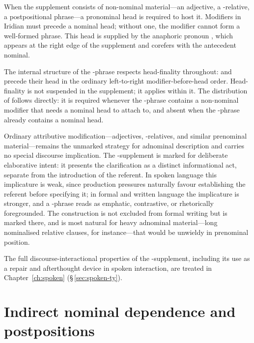 \pex
\a {}
\xe

When the supplement consists of non-nominal material---an adjective, a
-relative, a postpositional phrase---a pronominal head is required to
host it. Modifiers in Iridian must precede a nominal head; without one, the
modifier cannot form a well-formed phrase. This head is supplied by the
anaphoric pronoun , which appears at the right edge of the supplement and
corefers with the antecedent nominal.

\pex
\a {}
\a {}
\xe

\noindent The internal structure of the -phrase respects head-finality
throughout:  and  precede their head  in
the ordinary left-to-right modifier-before-head order. Head-finality is not
suspended in the supplement; it applies within it. The distribution of 
follows directly: it is required whenever the -phrase contains a
non-nominal modifier that needs a nominal head to attach to, and absent when the
-phrase already contains a nominal head.

Ordinary attributive modification---adjectives, -relatives, and
similar prenominal material---remains the unmarked strategy for adnominal
description and carries no special discourse implication. The
-supplement is marked for deliberate elaborative intent: it presents the
clarification as a distinct informational act, separate from the introduction of
the referent. In spoken language this implicature is weak, since production
pressures naturally favour establishing the referent before specifying it; in
formal and written language the implicature is stronger, and a -phrase
reads as emphatic, contrastive, or rhetorically foregrounded. The construction
is not excluded from formal writing but is marked there, and is most natural for
heavy adnominal material---long nominalised relative clauses, for
instance---that would be unwieldy in prenominal position.

The full discourse-interactional properties of the -supplement,
including its use as a repair and afterthought device in spoken interaction, are
treated in Chapter~\ref{ch:spoken} (\S\,\ref{sec:spoken-ty}).

\FloatBarrier

\section{Indirect nominal dependence and postpositions}
\label{sec:nm-ext}

